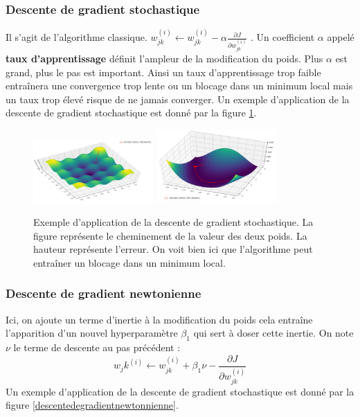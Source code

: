\subsubsection{Descente de gradient stochastique}
Il s'agit de l'algorithme classique.  $w_{jk}^{(i)} \leftarrow w_{jk}^{(i)} - \alpha \frac{\partial J}{\partial w_{jk}^{(i)}}$ . Un coefficient $\alpha$ appelé \textbf{taux d'apprentissage} définit l'ampleur de la modification du poids. Plus $\alpha$ est grand, plus le pas est important. Ainsi un taux d'apprentissage trop faible entraînera une convergence trop lente ou un blocage dans un minimum local mais un taux trop élevé risque de ne jamais converger. Un exemple d'application de la descente de gradient stochastique est donné par la figure \ref{descentedegradientstochastique}.

\begin{figure}[!h]
\centering
\includegraphics[width=130pt]{"images/MLP/descentedegradientstochastique"}
\hspace*{10mm}
\includegraphics[width=130pt]{"images/MLP/descentedegradientstochastiquepropre"}
\caption{Exemple d'application de la descente de gradient stochastique. La figure représente le cheminement de la valeur des deux poids. La hauteur représente l'erreur. On voit bien ici que l'algorithme peut entraîner un blocage dans un minimum local.}
\label{descentedegradientstochastique}
\end{figure}



\subsubsection{Descente de gradient newtonienne}
Ici, on ajoute un terme d'inertie à la modification du poids cela entraîne l'apparition d'un nouvel hyperparamètre $\beta_1$ qui sert à doser cette inertie. On note $\nu$ le terme de descente au pas précédent : $$ w_j{k}^{(i)} \leftarrow w_{jk}^{(i)} + \beta_1 \nu - \frac{\partial J}{\partial w_{jk}^{(i)}}$$
Un exemple d'application de la descente de gradient stochastique est donné par la figure \ref{descentedegradientnewtonnienne}.
	
